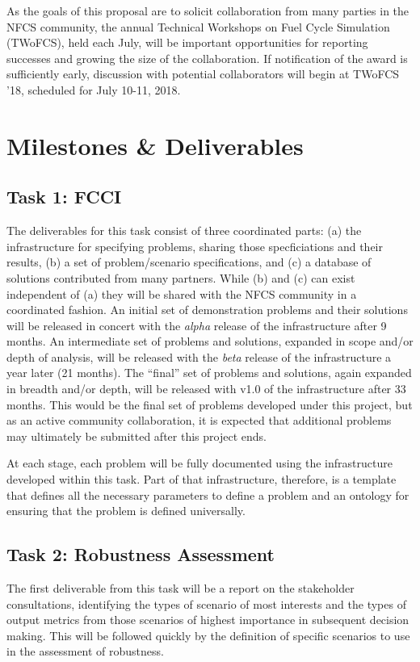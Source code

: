 As the goals of this proposal are to solicit collaboration from many parties
in the \gls{NFCS} community, the annual Technical Workshops on Fuel Cycle
Simulation (TWoFCS), held each July, will be important opportunities for
reporting successes and growing the size of the collaboration.  If
notification of the award is sufficiently early, discussion with potential
collaborators will begin at TWoFCS '18, scheduled for July 10-11, 2018.

\section{Milestones \& Deliverables}

\subsection{Task 1: \gls{FCCI}}

The deliverables for this task consist of three coordinated parts: (a) the
infrastructure for specifying problems, sharing those specficiations and their
results, (b) a set of problem/scenario specifications, and (c) a database of
solutions contributed from many partners.  While (b) and (c) can exist
independent of (a) they will be shared with the \gls{NFCS} community in a
coordinated fashion.  An initial set of demonstration problems and their
solutions will be released in concert with the \emph{alpha} release of the
infrastructure after 9 months.  An intermediate set of problems and solutions,
expanded in scope and/or depth of analysis, will be released with the
\emph{beta} release of the infrastructure a year later (21 months).  The
``final'' set of problems and solutions, again expanded in breadth and/or
depth, will be released with v1.0 of the infrastructure after 33 months.  This
would be the final set of problems developed under this project, but as an
active community collaboration, it is expected that additional problems may
ultimately be submitted after this project ends.

At each stage, each problem will be fully documented using the infrastructure
developed within this task.  Part of that infrastructure, therefore, is a
template that defines all the necessary parameters to define a problem and an
ontology for ensuring that the problem is defined universally.

\subsection{Task 2: Robustness Assessment}

The first deliverable from this task will be a report on the stakeholder
consultations, identifying the types of scenario of most interests and the
types of output metrics from those scenarios of highest importance in
subsequent decision making.  This will be followed quickly by the definition
of specific scenarios to use in the assessment of robustness.

